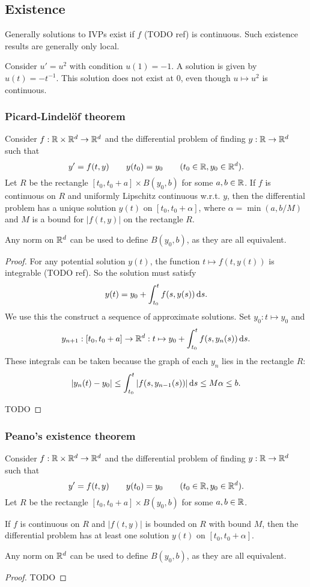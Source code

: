 \subsection{Existence}
Generally solutions to IVPs exist if $f$ (TODO ref) is continuous. Such existence results are generally only local.

\begin{example}
Consider $u' = u^2$ with condition $u(1) = -1$. A solution is given by $u(t) = -t^{-1}$. This solution does not exist at $0$, even though $u\mapsto u^2$ is continuous.
\end{example}

\subsubsection{Picard-Lindelöf theorem}
\begin{theorem}
Consider $f: \mathbb{R}\times \mathbb{R}^d \to \mathbb{R}^d$ and the differential problem of finding $y:\mathbb{R}\to \mathbb{R}^d$ such that
\[ y' = f(t,y) \qquad y(t_0) = y_0 \qquad (t_0\in \mathbb{R}, y_0\in\mathbb{R}^d). \]
Let $R$ be the rectangle $[t_0,t_0+a]\times B(y_0, b)$ for some $a,b\in \mathbb{R}$.
If $f$ is continuous on $R$  and uniformly Lipschitz continuous w.r.t. $y$, then the differential problem has a unique solution $y(t)$ on $[t_0,t_0+\alpha]$, where $\alpha = \min(a,b/M)$ and $M$ is a bound for $|f(t,y)|$ on the rectangle $R$.
\end{theorem}
Any norm on $\mathbb{R}^d$ can be used to define $B(y_0, b)$, as they are all equivalent.
\begin{proof}
For any potential solution $y(t)$, the function $t\mapsto f(t,y(t))$ is integrable (TODO ref). So the solution must satisfy \[ y(t) = y_0 + \int_{t_0}^tf(s, y(s))\operatorname{d \!}{s}. \]
We use this the construct a sequence of approximate solutions. Set $y_0: t\mapsto y_0$ and
\[ y_{n+1}: [t_0, t_0+a] \to \mathbb{R}^d: t\mapsto y_0 + \int_{t_0}^t f(s,y_n(s))\operatorname{d \!}{s}. \]
These integrals can be taken because the graph of each $y_n$ lies in the rectangle $R$:
\[ |y_n(t) - y_0| \leq \int_{t_0}^t|f(s,y_{n-1}(s))|\operatorname{d \!}{s} \leq M\alpha \leq b. \]

TODO
\end{proof}

\subsubsection{Peano's existence theorem}
\begin{theorem}
Consider $f: \mathbb{R}\times \mathbb{R}^d \to \mathbb{R}^d$ and the differential problem of finding $y:\mathbb{R}\to \mathbb{R}^d$ such that
\[ y' = f(t,y) \qquad y(t_0) = y_0 \qquad (t_0\in \mathbb{R}, y_0\in\mathbb{R}^d). \]
Let $R$ be the rectangle $[t_0,t_0+a]\times B(y_0, b)$ for some $a,b\in \mathbb{R}$.

If $f$ is continuous on $R$ and $|f(t,y)|$ is bounded on $R$ with bound $M$, then the differential problem has at least one solution $y(t)$ on $[t_0,t_0+\alpha]$.
\end{theorem}
Any norm on $\mathbb{R}^d$ can be used to define $B(y_0, b)$, as they are all equivalent.
\begin{proof}
TODO
\end{proof}

